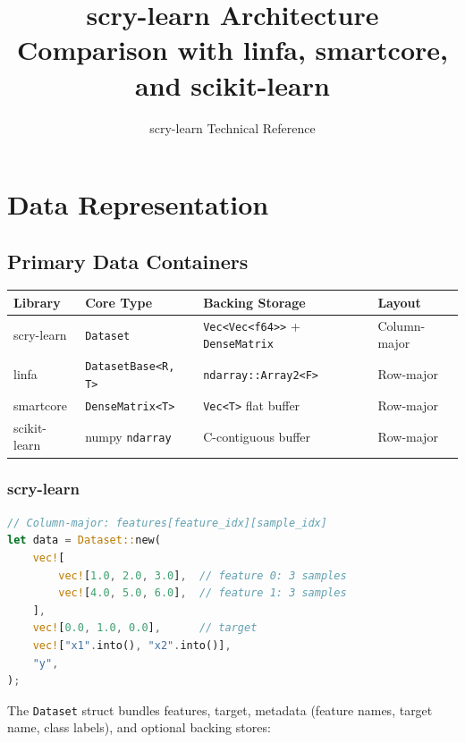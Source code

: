 \documentclass[11pt,a4paper]{article}
\title{\vspace{-1cm}\textbf{scry-learn Architecture}\\[0.3em]
\large Comparison with linfa, smartcore, and scikit-learn}
\author{scry-learn Technical Reference}
\date{}
\begin{document}
\maketitle
\thispagestyle{fancy}

\tableofcontents
\newpage

\section{Data Representation}

\subsection{Primary Data Containers}

\begin{center}
\begin{tabular}{llll}
\toprule
\textbf{Library} & \textbf{Core Type} & \textbf{Backing Storage} & \textbf{Layout} \\
\midrule
scry-learn & \texttt{Dataset} & \texttt{Vec<Vec<f64>{>}} + \texttt{DenseMatrix} & Column-major \\
linfa & \texttt{DatasetBase<R, T>} & \texttt{ndarray::Array2<F>} & Row-major \\
smartcore & \texttt{DenseMatrix<T>} & \texttt{Vec<T>} flat buffer & Row-major \\
scikit-learn & numpy \texttt{ndarray} & C-contiguous buffer & Row-major \\
\bottomrule
\end{tabular}
\end{center}

\subsubsection*{scry-learn}

\begin{lstlisting}[language=Rust]
// Column-major: features[feature_idx][sample_idx]
let data = Dataset::new(
    vec![
        vec![1.0, 2.0, 3.0],  // feature 0: 3 samples
        vec![4.0, 5.0, 6.0],  // feature 1: 3 samples
    ],
    vec![0.0, 1.0, 0.0],      // target
    vec!["x1".into(), "x2".into()],
    "y",
);
\end{lstlisting}

The \texttt{Dataset} struct bundles features, target, metadata (feature names, target name, class labels), and optional backing stores:
\end{document}
